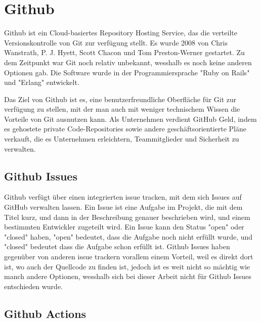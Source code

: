 \section{Github}

Github ist ein Cloud-basiertes Repository Hosting Service, das die verteilte Versionskontrolle von Git zur verfügung stellt. Es wurde 2008 von Chris Wanstrath, P. J. Hyett, 
Scott Chacon und Tom Preston-Werner gestartet. Zu dem Zeitpunkt war Git noch relativ unbekannt, wesshalb es noch keine anderen Optionen gab. Die Software wurde in der 
Programmiersprache "Ruby on Rails" und "Erlang" entwickelt. 
\cite{sysarch-github-1}

Das Ziel von Github ist es, eine benutzerfreundliche Oberfläche für Git zur verfügung zu stellen, mit der man auch mit weniger technischem Wissen die Vorteile von Git ausnutzen kann.
Als Unternehmen verdient GitHub Geld, indem es gehostete private Code-Repositories sowie andere geschäftsorientierte Pläne verkauft, 
die es Unternehmen erleichtern, Teammitglieder und Sicherheit zu verwalten.
\cite{sysarch-github-2}

\subsection{Github Issues}

Github verfügt über einen integrierten issue tracken, mit dem sich Issues auf GitHub verwalten lassen. Ein Issue ist eine 
Aufgabe im Projekt, die mit dem Titel kurz, und dann in der Beschreibung genauer beschrieben wird, und einem bestimmten Entwickler 
zugeteilt wird. Ein Issue kann den Status "open" oder "closed" haben, "open" bedeutet, dass die Aufgabe noch nicht erfüllt wurde, und 
"closed" bedeutet dass die Aufgabe schon erfüllt ist. Github Issues haben gegenüber von anderen issue trackern vorallem einem Vorteil, 
weil es direkt dort ist, wo auch der Quellcode zu finden ist, jedoch ist es weit nicht so mächtig wie manch andere Optionen, wesshalb 
sich bei dieser Arbeit nicht für Github Issues entschieden wurde.
\cite{sysarch-github-3}

\subsection{Github Actions}

